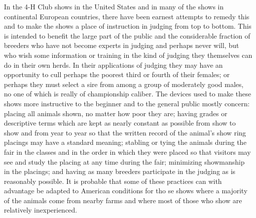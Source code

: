In the 4-H Club shows in the United States and in many of the
shows in continental European countries, there have been earnest
attempts to remedy this and to make the shows a place of instruction in
judging from top to bottom. This is intended to benefit the large part
of the public and the considerable fraction of breeders who have not
become experts in judging and perhaps never will, but who wish some
information or training in the kind of judging they themselves can do
in their own herds. In their applications of judging they may have an
opportunity to cull perhaps the poorest third or fourth of their females;
or perhaps they must select a sire from among a group of moderately
good males, no one of which is really of championship caliber. The
devices used to make these shows more instructive to the beginner and
to the general public mostly concern: placing all animals shown, no
matter how poor they are; having grades or descriptive terms which are
kept as nearly constant as possible from show to show and from year to
year so that the written record of the animal's show ring placings may
have a standard meaning; stabling or tying the animals during the fair
in the classes and in the order in which they were placed so that visitors
may see and study the placing at any time during the fair; minimizing
showmanship in the placings; and having as many breeders participate
in the judging as is reasonably possible. It is probable that some of these
practices can with advantage be adapted to American conditions for
tho se shows where a majority of the animals come from nearby farms
and where most of those who show are relatively inexperienced.

